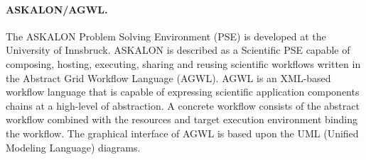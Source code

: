 \paragraph{ASKALON/AGWL.} The ASKALON Problem Solving Environment (PSE)
\cite{fahringer2014} is developed at the University of Innsbruck.
ASKALON is described as a Scientific PSE capable of composing, hosting,
executing, sharing and reusing scientific workflows written in the Abstract
Grid Workflow Language (AGWL). AGWL is an XML-based workflow language that is
capable of expressing scientific application components chains at a high-level
of abstraction. A concrete workflow consists of the abstract workflow combined
with the resources and target execution environment binding the workflow. The
graphical interface of AGWL is based upon the UML (Unified Modeling Language)
diagrams.
